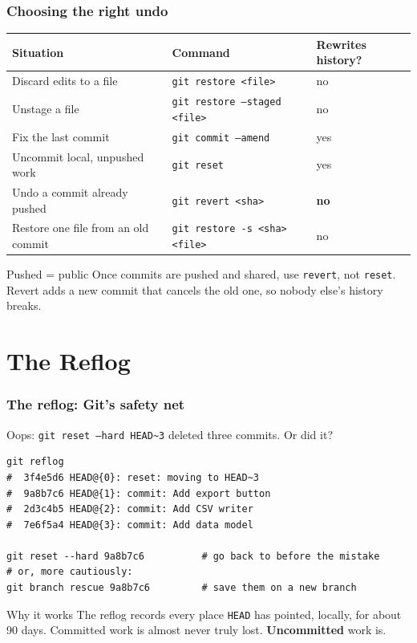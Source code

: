 \documentclass[aspectratio=169,10pt,compress]{beamer}
\newcommand{\cmd}[1]{\texttt{\color{gitred}#1}}
\begin{document}
\begin{frame}[t,fragile] \frametitle{Choosing the right undo}
  \small
  \begin{tabular}{@{}L{0.37\textwidth}L{0.4\textwidth}L{0.18\textwidth}@{}}
    \toprule
    \textbf{Situation} & \textbf{Command} & \textbf{Rewrites history?} \\
    \midrule
    Discard edits to a file & \cmd{git restore <file>} & no \\
    Unstage a file & \cmd{git restore --staged <file>} & no \\
    Fix the last commit & \cmd{git commit --amend} & yes \\
    Uncommit local, unpushed work & \cmd{git reset} & yes \\
    Undo a commit already pushed & \cmd{git revert <sha>} & \textbf{no} \\
    Restore one file from an old commit & \cmd{git restore -s <sha> <file>} & no \\
    \bottomrule
  \end{tabular}

  \vspace{1em}
  \begin{alertblock}{Pushed = public}
    Once commits are pushed and shared, use \cmd{revert}, not \cmd{reset}.
    Revert adds a new commit that cancels the old one, so nobody else's history breaks.
  \end{alertblock}
\end{frame}

\section[Reflog]{The Reflog}

\begin{frame}[t,fragile] \frametitle{The reflog: Git's safety net}
  Oops: \cmd{git reset --hard HEAD\textasciitilde3} deleted three commits. Or did it?

\begin{lstlisting}
git reflog
#  3f4e5d6 HEAD@{0}: reset: moving to HEAD~3
#  9a8b7c6 HEAD@{1}: commit: Add export button
#  2d3c4b5 HEAD@{2}: commit: Add CSV writer
#  7e6f5a4 HEAD@{3}: commit: Add data model

git reset --hard 9a8b7c6          # go back to before the mistake
# or, more cautiously:
git branch rescue 9a8b7c6         # save them on a new branch
\end{lstlisting}

  \begin{block}{Why it works}
    The reflog records every place \texttt{HEAD} has pointed, locally, for about 90 days.
    Committed work is almost never truly lost. \textbf{Uncommitted} work is.
  \end{block}
\end{frame}
\end{document}
